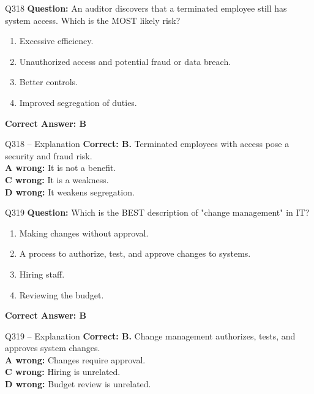\documentclass[aspectratio=169,10pt]{beamer}
\begin{document}
	\begin{frame}[t]{Q318}
		\small
		\textbf{Question:} An auditor discovers that a terminated employee still has system access. Which is the MOST likely risk?
		\begin{enumerate}[label=\Alph*.,itemsep=1pt,topsep=2pt]
			\item Excessive efficiency.
			\item Unauthorized access and potential fraud or data breach.
			\item Better controls.
			\item Improved segregation of duties.
		\end{enumerate}
		\vspace{4pt}
		\textbf{Correct Answer: B}
	\end{frame}
	
	\begin{frame}[t]{Q318 -- Explanation}
		\small
		\textbf{Correct: B.} Terminated employees with access pose a security and fraud risk. \\[4pt]
		\textbf{A wrong:} It is not a benefit. \\[2pt]
		\textbf{C wrong:} It is a weakness. \\[2pt]
		\textbf{D wrong:} It weakens segregation.
	\end{frame}
	
	\begin{frame}[t]{Q319}
		\small
		\textbf{Question:} Which is the BEST description of "change management" in IT?
		\begin{enumerate}[label=\Alph*.,itemsep=1pt,topsep=2pt]
			\item Making changes without approval.
			\item A process to authorize, test, and approve changes to systems.
			\item Hiring staff.
			\item Reviewing the budget.
		\end{enumerate}
		\vspace{4pt}
		\textbf{Correct Answer: B}
	\end{frame}
	
	\begin{frame}[t]{Q319 -- Explanation}
		\small
		\textbf{Correct: B.} Change management authorizes, tests, and approves system changes. \\[4pt]
		\textbf{A wrong:} Changes require approval. \\[2pt]
		\textbf{C wrong:} Hiring is unrelated. \\[2pt]
		\textbf{D wrong:} Budget review is unrelated.
	\end{frame}
	
\end{document}
